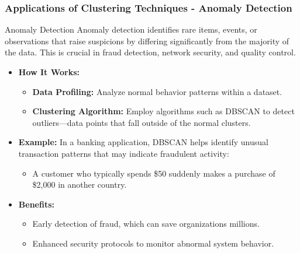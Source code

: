 \documentclass[aspectratio=169]{beamer}
\begin{document}
\begin{frame}[fragile]
    \frametitle{Applications of Clustering Techniques - Anomaly Detection}
    \begin{block}{Anomaly Detection}
        Anomaly detection identifies rare items, events, or observations that raise suspicions by differing significantly from the majority of the data. This is crucial in fraud detection, network security, and quality control.
    \end{block}

    \begin{itemize}
        \item \textbf{How It Works:}
            \begin{itemize}
                \item \textbf{Data Profiling:} Analyze normal behavior patterns within a dataset.
                \item \textbf{Clustering Algorithm:} Employ algorithms such as DBSCAN to detect outliers—data points that fall outside of the normal clusters.
            \end{itemize}
        
        \item \textbf{Example:} In a banking application, DBSCAN helps identify unusual transaction patterns that may indicate fraudulent activity:
            \begin{itemize}
                \item A customer who typically spends \$50 suddenly makes a purchase of \$2,000 in another country.
            \end{itemize}

        \item \textbf{Benefits:}
            \begin{itemize}
                \item Early detection of fraud, which can save organizations millions.
                \item Enhanced security protocols to monitor abnormal system behavior.
            \end{itemize}
    \end{itemize}
\end{frame}
\end{document}
